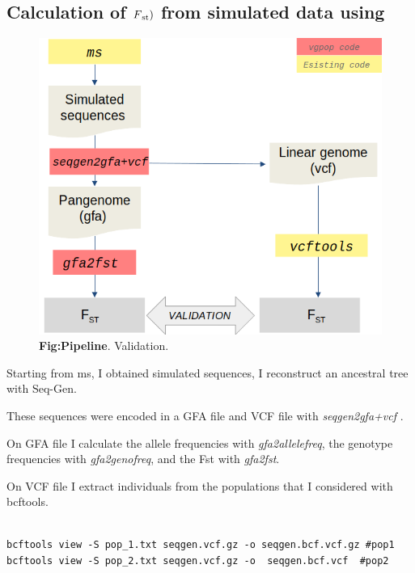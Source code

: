 
\subsection{Calculation of  $F\textsubscript{st})$  from simulated data using \vgp}


\begin{figure}[H]
\centering
\includegraphics[width=1.00\textwidth]{fig/pipeline_new.png}
\decoRule
\caption{\textbf{Fig:Pipeline}. 
Validation.}
\label{fig:pipeline.pdf}
\end{figure}

Starting from ms, I obtained simulated sequences, I reconstruct an ancestral tree with Seq-Gen. 

These sequences were encoded in a GFA file and VCF file with \textit{seqgen2gfa+vcf }.


On GFA file I calculate the allele frequencies with \textit{gfa2allelefreq}, the genotype frequencies with \textit{gfa2genofreq}, and the Fst with \textit{gfa2fst}. 

On VCF file I extract individuals from the populations that I considered with bcftools. %
\begin{verbatim}

bcftools view -S pop_1.txt seqgen.vcf.gz -o seqgen.bcf.vcf.gz #pop1
bcftools view -S pop_2.txt seqgen.vcf.gz -o  seqgen.bcf.vcf  #pop2 
\end{verbatim}

